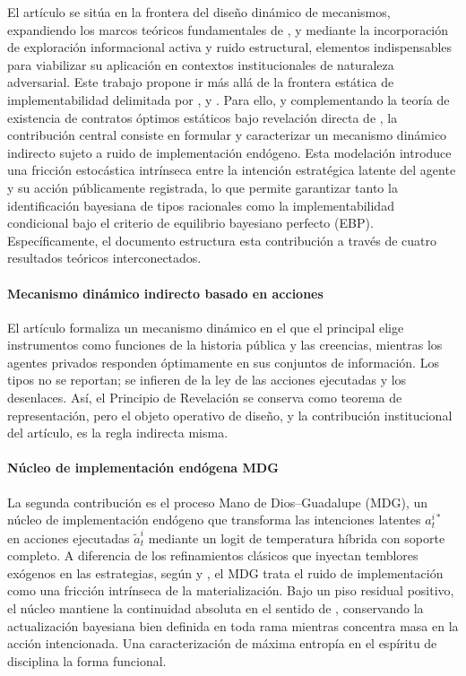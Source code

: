 \documentclass[review,authoryear,12pt]{elsarticle}
\theoremstyle{plain}
\theoremstyle{definition}
\newcommand{\1}{\mathbf{1}}
\begin{document}
El artículo se sitúa en la frontera del diseño dinámico de mecanismos, expandiendo los marcos teóricos fundamentales de \citet{CourtyLi2000}, \citet{EsoSzentes2007} y \citet{PavanSegalToikka2014} mediante la incorporación de exploración informacional activa y ruido estructural, elementos indispensables para viabilizar su aplicación en contextos institucionales de naturaleza adversarial. Este trabajo propone ir más allá de la frontera estática de implementabilidad delimitada por \citet{MyersonSatterthwaite1983}, \citet{Rochet1987} y \citet{RochetChone1998}. Para ello, y complementando la teoría de existencia de contratos óptimos estáticos bajo revelación directa de \citet{KadanRenySwinkels2017}, la contribución central consiste en formular y caracterizar un mecanismo dinámico indirecto sujeto a ruido de implementación endógeno. Esta modelación introduce una fricción estocástica intrínseca entre la intención estratégica latente del agente y su acción públicamente registrada, lo que permite garantizar tanto la identificación bayesiana de tipos racionales como la implementabilidad condicional bajo el criterio de equilibrio bayesiano perfecto (EBP). Específicamente, el documento estructura esta contribución a través de cuatro resultados teóricos interconectados.

\paragraph{Mecanismo dinámico indirecto basado en acciones}
El artículo formaliza un mecanismo dinámico en el que el principal elige instrumentos como funciones de la historia pública y las creencias, mientras los agentes privados responden óptimamente en sus conjuntos de información. Los tipos no se reportan; se infieren de la ley de las acciones ejecutadas y los desenlaces. Así, el Principio de Revelación se conserva como teorema de representación, pero el objeto operativo de diseño, y la contribución institucional del artículo, es la regla indirecta misma.

\paragraph{Núcleo de implementación endógena MDG}
La segunda contribución es el proceso Mano de Dios--Guadalupe (MDG), un núcleo de implementación endógeno que transforma las intenciones latentes $a_t^{i\ast}$ en acciones ejecutadas $\tilde a_t^i$ mediante un logit de temperatura híbrida con soporte completo. A diferencia de los refinamientos clásicos que inyectan temblores exógenos en las estrategias, según \citet{Selten1975Perfectness} y \citet{KrepsWilson1982}, el MDG trata el ruido de implementación como una fricción intrínseca de la materialización. Bajo un piso residual positivo, el núcleo mantiene la continuidad absoluta en el sentido de \citet{KalaiLehrer1993}, conservando la actualización bayesiana bien definida en toda rama mientras concentra masa en la acción intencionada. Una caracterización de máxima entropía en el espíritu de \citet{Jaynes1957Information} disciplina la forma funcional.
\end{document}
